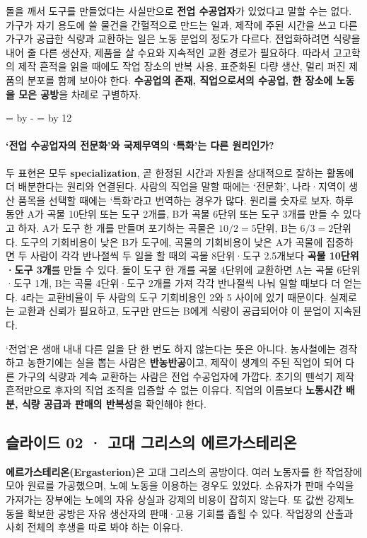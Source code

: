 \documentclass[10pt,a4paper]{article}
\newcommand{\ReserveQuestionSpace}{%
  \par\begingroup
  \dimen0=\pagegoal \advance\dimen0 by -\pagetotal
  \dimen2=\baselineskip \multiply\dimen2 by 12
  \ifdim\dimen0<\dimen2 \newpage\fi
  \endgroup}
\begin{document}
돌을 깨서 도구를 만들었다는 사실만으로 \textbf{전업 수공업자}가 있었다고 말할 수는 없다. 가구가 자기 용도에 쓸 물건을 간헐적으로 만드는 일과, 제작에 주된 시간을 쓰고 다른 가구가 공급한 식량과 교환하는 일은 노동 분업의 정도가 다르다. 전업화하려면 식량을 내어 줄 다른 생산자, 제품을 살 수요와 지속적인 교환 경로가 필요하다. 따라서 고고학의 제작 흔적을 읽을 때에도 작업 장소의 반복 사용, 표준화된 다량 생산, 멀리 퍼진 제품의 분포를 함께 보아야 한다. \textbf{수공업의 존재, 직업으로서의 수공업, 한 장소에 노동을 모은 공방}을 차례로 구별하자.\par

\ReserveQuestionSpace
\paragraph{‘전업 수공업자의 전문화’와 국제무역의 ‘특화’는 다른 원리인가?}
두 표현은 모두 \textbf{specialization}, 곧 한정된 시간과 자원을 상대적으로 잘하는 활동에 더 배분한다는 원리와 연결된다. 사람의 직업을 말할 때에는 ‘전문화’, 나라·지역이 생산 품목을 선택할 때에는 ‘특화’라고 번역하는 경우가 많다. 원리를 숫자로 보자. 하루 동안 A가 곡물 10단위 또는 도구 2개를, B가 곡물 6단위 또는 도구 3개를 만들 수 있다고 하자. A가 도구 한 개를 만들며 포기하는 곡물은 $10/2=5$단위, B는 $6/3=2$단위다. 도구의 기회비용이 낮은 B가 도구에, 곡물의 기회비용이 낮은 A가 곡물에 집중하면 두 사람이 각각 반나절씩 두 일을 할 때의 곡물 8단위·도구 2.5개보다 \textbf{곡물 10단위·도구 3개}를 만들 수 있다. 둘이 도구 한 개를 곡물 4단위에 교환하면 A는 곡물 6단위·도구 1개, B는 곡물 4단위·도구 2개를 가져 각각 반나절씩 나눠 일할 때보다 더 얻는다. 4라는 교환비율이 두 사람의 도구 기회비용인 2와 5 사이에 있기 때문이다. 실제로는 교환과 신뢰가 필요하고, 도구만 만드는 B에게 식량이 공급되어야 이 분업이 지속된다.\par

‘전업’은 생애 내내 다른 일을 단 한 번도 하지 않는다는 뜻은 아니다. 농사철에는 경작하고 농한기에는 실을 뽑는 사람은 \textbf{반농반공}이고, 제작이 생계의 주된 직업이 되어 다른 가구의 식량과 계속 교환하는 사람은 전업 수공업자에 가깝다. 초기의 뗀석기 제작 흔적만으로 후자의 직업 조직을 입증할 수 없는 이유다. 직업의 이름보다 \textbf{노동시간 배분, 식량 공급과 판매의 반복성}을 확인해야 한다.\par

\subsection{슬라이드 02 · 고대 그리스의 에르가스테리온}
\textbf{에르가스테리온(Ergasterion)}은 고대 그리스의 공방이다. 여러 노동자를 한 작업장에 모아 원료를 가공했으며, 노예 노동을 이용하는 경우도 있었다. 소유자가 판매 수익을 가져가는 장부에는 노예의 자유 상실과 강제의 비용이 잡히지 않는다. 또 값싼 강제노동을 확보한 공방은 자유 생산자의 판매·고용 기회를 좁힐 수 있다. 작업장의 산출과 사회 전체의 후생을 따로 봐야 하는 이유다.\par
\end{document}
